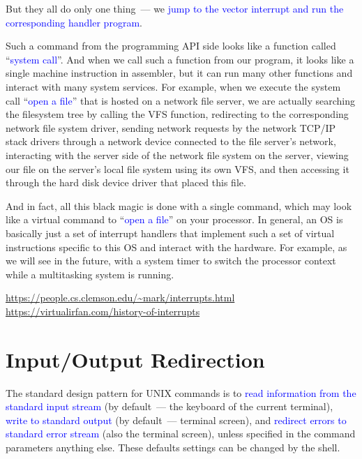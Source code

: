 \documentclass[12pt]{report}
\newcommand{\struct}[1]{\textcolor{blue}{#1}}
\begin{document}
\medskip
But they all do only one thing~--- we \struct{jump to the vector interrupt and
run the corresponding handler program}.

\medskip
Such a command from the programming API side looks like a function called
``\struct{system call}''. And when we call such a function from our program,
it looks like a single machine instruction in assembler, but it can run many
other functions and interact with many system services. For example, when
we execute the system call ``\struct{open a file}'' that is hosted on a network
file server, we are actually searching the filesystem tree by calling
the VFS function, redirecting to the corresponding network file system driver,
sending network requests by the network TCP/IP stack drivers through a network
device connected to the file server's network, interacting with the server side
of the network file system on the server, viewing our file on the server's
local file system using its own VFS, and then accessing it through the hard disk
device driver that placed this file.

\medskip
And in fact, all this black magic is done with a single command, which may
look like a virtual command to ``\struct{open a file}'' on your processor.
In general, an OS is basically just a set of interrupt handlers that implement
such a set of virtual instructions specific to this OS and interact with
the hardware. For example, as we will see in the future, with a system timer
to switch the processor context while a multitasking system is running.

\medskip
\href{https://people.cs.clemson.edu/~mark/interrupts.html}%
{\url{https://people.cs.clemson.edu/~mark/interrupts.html}}\\
\href{https://virtualirfan.com/history-of-interrupts}%
{\url{https://virtualirfan.com/history-of-interrupts}}

\section*{Input/Output Redirection}

The standard design pattern for UNIX commands is to \struct{read information
from the standard input stream} (by default~--- the keyboard of the current
terminal), \struct{write to standard output} (by default~--- terminal screen),
and \struct{redirect errors to standard error stream} (also the terminal screen),
unless specified in the command parameters anything else.
These defaults settings can be changed by the shell.
\end{document}
